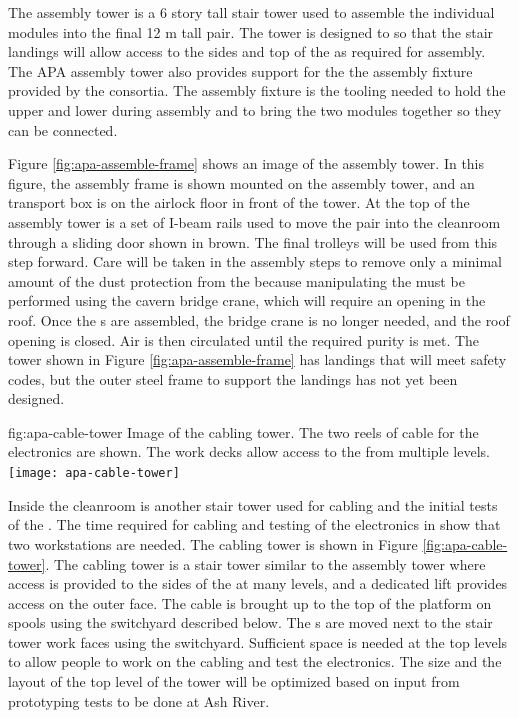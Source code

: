 The  assembly tower is a 6 story tall stair tower used to assemble the individual  modules into the final 12 \si{m} tall pair. 
The tower is designed to so that the stair landings will allow access to the sides and top of the  as required for assembly. 
The APA assembly tower also provides support for the the  assembly fixture provided by the  consortia. 
The  assembly fixture is the tooling needed to hold the upper and lower  during assembly and to bring the two modules together so they can be connected. 

Figure \ref{fig:apa-assemble-frame} shows an image of the  assembly tower. 
In this figure, the  assembly frame is shown mounted on the assembly tower, and an  transport box is on the airlock floor in front of the tower. 
At the top of the  assembly tower is a set of I-beam rails used to move the  pair into the cleanroom through a sliding door shown in brown. 
The final trolleys will be used from this step forward. 
Care will be taken in the  assembly steps to remove only a minimal amount of the dust protection from the  because manipulating the  must be performed using the cavern bridge crane, which will require an opening in the roof. 
Once the s are assembled, the bridge crane is no longer needed, and the roof opening is closed. Air is then circulated until the required purity is met. The tower shown in Figure \ref{fig:apa-assemble-frame} has landings that will meet safety codes, but the outer steel frame to support the landings has not yet been designed.


\begin{dunefigure}{fig:apa-cable-tower}
  {Image of the  cabling tower. The two reels of cable for the electronics are shown. The work decks allow access to the  from multiple levels. }
\texttt{[image: apa-cable-tower]}
\end{dunefigure}

Inside the cleanroom is another stair tower used for cabling and the initial tests of the . The time required for cabling and testing of the electronics in  show that two workstations are needed. The  cabling tower is shown in Figure \ref{fig:apa-cable-tower}. The  cabling tower is a stair tower similar to the  assembly tower where access is provided to the sides of the  at many levels, and a dedicated lift provides access on the outer face. The cable is brought up to the top of the platform on spools using the switchyard described below. The s are moved next to the stair tower work faces using the switchyard.  Sufficient space is needed at the top levels to allow people to work on the cabling and test the electronics. The size and the layout of the top level of the tower will be optimized based on input from prototyping tests to be done at Ash River. 

